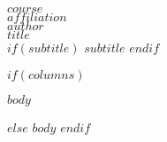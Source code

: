 \documentclass[letterpaper,10pt,twoside]{article}
\begin{document}
\thispagestyle{empty}


\begin{flushleft}

\rmfamily\normalsize{$course$} \\ 
\vspace{1mm}
\rmfamily\footnotesize{$affiliation$}  \\
\rmfamily\footnotesize{$author$} \\
\vspace{.5cm}
\titlefont\LARGE{$title$} \\
$if(subtitle)$
\vspace{.2cm}
\titlefont\Large{$subtitle$} 
$endif$
\end{flushleft}

\singlespacing


$if(columns)$
\setlength{\columnsep}{5em}
\begin{multicols*}{2}
$body$
\end{multicols*}

$else$
$body$
$endif$
\end{document}
